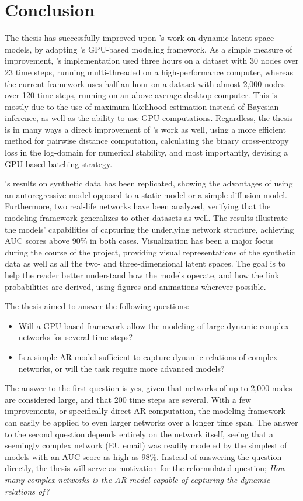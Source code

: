 \chapter{Conclusion}\label{ch:Conclusion}

The thesis has successfully improved upon \citeauthor{zangenberg2018a}'s work on dynamic latent space models, by adapting \citeauthor{jacobsen2018a}'s GPU-based modeling framework. 
As a simple measure of improvement, \citeauthor{zangenberg2018a}'s implementation used three hours on a dataset with 30 nodes over 23 time steps, running multi-threaded on a high-performance computer, whereas the current framework uses half an hour on a dataset with almost 2,000 nodes over 120 time steps, running on an above-average desktop computer.
This is mostly due to the use of maximum likelihood estimation instead of Bayesian inference, as well as the ability to use GPU computations. Regardless, the thesis is in many ways a direct improvement of \citeauthor{jacobsen2018a}'s work as well, using a more efficient method for pairwise distance computation, calculating the binary cross-entropy loss in the log-domain for numerical stability, and most importantly, devising a GPU-based batching strategy.

\citeauthor{zangenberg2018a}'s results on synthetic data has been replicated, showing the advantages of using an autoregressive model opposed to a static model or a simple diffusion model. Furthermore, two real-life networks have been analyzed, verifying that the modeling framework generalizes to other datasets as well. The results illustrate the models' capabilities of capturing the underlying network structure, achieving AUC scores above 90\% in both cases. Visualization has been a major focus during the course of the project, providing visual representations of the synthetic data as well as all the two- and three-dimensional latent spaces. The goal is to help the reader better understand how the models operate, and how the link probabilities are derived, using figures and animations wherever possible.

The thesis aimed to answer the following questions:
\begin{itemize}\itshape
    \item Will a GPU-based framework allow the modeling of large dynamic complex networks for several time steps?
    \item Is a simple AR model sufficient to capture dynamic relations of complex networks, or will the task require more advanced models?
\end{itemize}
The answer to the first question is yes, given that networks of up to 2,000 nodes are considered large, and that 200 time steps are several. With a few improvements, or specifically direct AR computation, the modeling framework can easily be applied to even larger networks over a longer time span.
The answer to the second question depends entirely on the network itself, seeing that a seemingly complex network (EU email) was readily modeled by the simplest of models with an AUC score as high as 98\%. Instead of answering the question directly, the thesis will serve as motivation for the reformulated question; \textit{How many complex networks is the AR model capable of capturing the dynamic relations of?}